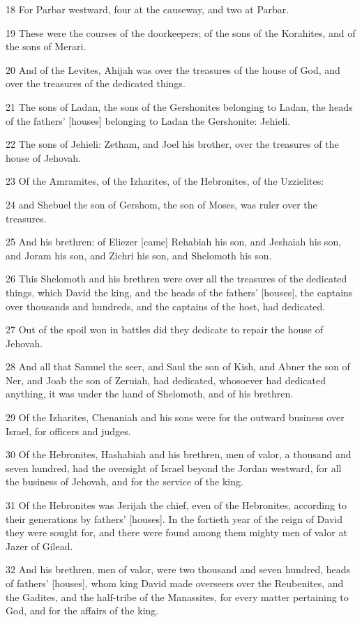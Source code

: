 \par 18 For Parbar westward, four at the causeway, and two at Parbar.
\par 19 These were the courses of the doorkeepers; of the sons of the Korahites, and of the sons of Merari.
\par 20 And of the Levites, Ahijah was over the treasures of the house of God, and over the treasures of the dedicated things.
\par 21 The sons of Ladan, the sons of the Gershonites belonging to Ladan, the heads of the fathers' [houses] belonging to Ladan the Gershonite: Jehieli.
\par 22 The sons of Jehieli: Zetham, and Joel his brother, over the treasures of the house of Jehovah.
\par 23 Of the Amramites, of the Izharites, of the Hebronites, of the Uzzielites:
\par 24 and Shebuel the son of Gershom, the son of Moses, was ruler over the treasures.
\par 25 And his brethren: of Eliezer [came] Rehabiah his son, and Jeshaiah his son, and Joram his son, and Zichri his son, and Shelomoth his son.
\par 26 This Shelomoth and his brethren were over all the treasures of the dedicated things, which David the king, and the heads of the fathers' [houses], the captains over thousands and hundreds, and the captains of the host, had dedicated.
\par 27 Out of the spoil won in battles did they dedicate to repair the house of Jehovah.
\par 28 And all that Samuel the seer, and Saul the son of Kish, and Abner the son of Ner, and Joab the son of Zeruiah, had dedicated, whosoever had dedicated anything, it was under the hand of Shelomoth, and of his brethren.
\par 29 Of the Izharites, Chenaniah and his sons were for the outward business over Israel, for officers and judges.
\par 30 Of the Hebronites, Hashabiah and his brethren, men of valor, a thousand and seven hundred, had the oversight of Israel beyond the Jordan westward, for all the business of Jehovah, and for the service of the king.
\par 31 Of the Hebronites was Jerijah the chief, even of the Hebronites, according to their generations by fathers' [houses]. In the fortieth year of the reign of David they were sought for, and there were found among them mighty men of valor at Jazer of Gilead.
\par 32 And his brethren, men of valor, were two thousand and seven hundred, heads of fathers' [houses], whom king David made overseers over the Reubenites, and the Gadites, and the half-tribe of the Manassites, for every matter pertaining to God, and for the affairs of the king.

